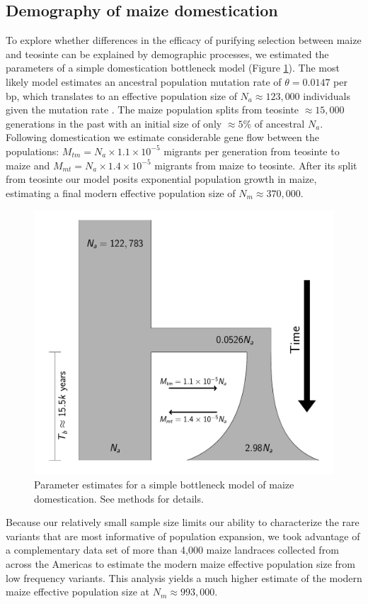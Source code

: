 \documentclass{pnastwo}
\begin{document}
\begin{article}
\subsection{Demography of maize domestication}
To explore whether differences in the efficacy of purifying selection between maize and teosinte can be explained by demographic processes, we estimated the parameters of a simple domestication bottleneck model  (Figure \ref{fig:bottleneck}). 
The most likely model estimates an ancestral population mutation rate of $\theta=0.0147$ per bp, which translates to an effective population size of $N_a \approx 123,000$ individuals given the mutation rate \cite{clark2005}.
The maize population splits from teosinte $\approx 15,000$ generations in the past with an initial size of only $\approx 5\% $ of ancestral $N_a$. 
Following domestication we estimate considerable gene flow between the populations: $M_{tm} = N_a \times 1.1 \times 10^{-5}$  migrants per generation from teosinte to maize and $M_{mt} = N_a \times 1.4 \times 10^{-5}$ migrants from maize to teosinte. 
After its split from teosinte our model posits exponential population growth in maize, estimating a final modern effective population size of $N_m \approx 370,000$.

\begin{figure}
\centering
\includegraphics[width=.4\textwidth]{FigsAndFiles/DomesticationModel/domesticationModel.pdf}
\caption{Parameter estimates for a simple bottleneck model of maize domestication. See methods for details. \label{fig:bottleneck} }
\end{figure}

Because our relatively small sample size limits our ability to characterize the rare variants that are most informative of population expansion, we took advantage of a complementary data set of more than 4,000 maize landraces collected from across the Americas \cite{Hearne2015} to estimate the modern maize effective population size from low frequency variants. 
This analysis yields a much higher estimate of the modern maize effective population size at  $N_m \approx 993,000$.


\end{article}
\end{document}
